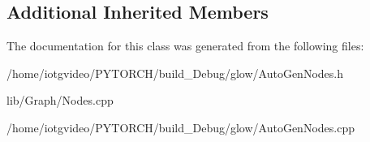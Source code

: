 \subsection*{Additional Inherited Members}


The documentation for this class was generated from the following files\+:\begin{DoxyCompactItemize}
\item 
/home/iotgvideo/\+P\+Y\+T\+O\+R\+C\+H/build\+\_\+\+Debug/glow/Auto\+Gen\+Nodes.\+h\item 
lib/\+Graph/Nodes.\+cpp\item 
/home/iotgvideo/\+P\+Y\+T\+O\+R\+C\+H/build\+\_\+\+Debug/glow/Auto\+Gen\+Nodes.\+cpp\end{DoxyCompactItemize}
